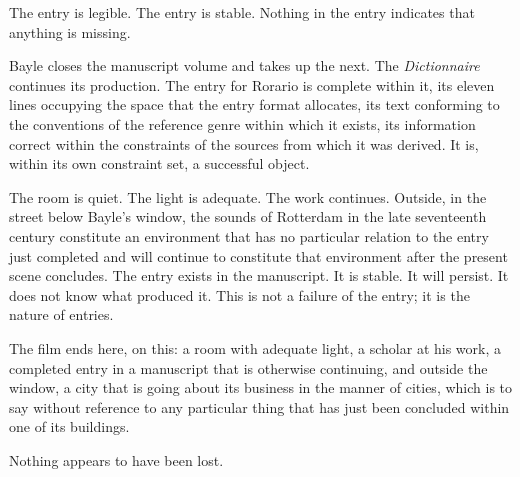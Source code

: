\documentclass[12pt, oneside]{article}
\newenvironment{action}{%
  \vspace{0.6em}%
  \noindent\ignorespaces%
}{%
  \par\vspace{0.6em}%
}
\begin{document}
\begin{action}
The entry is legible. The entry is stable. Nothing in the entry indicates that anything is missing.

Bayle closes the manuscript volume and takes up the next. The \textit{Dictionnaire} continues its production. The entry for Rorario is complete within it, its eleven lines occupying the space that the entry format allocates, its text conforming to the conventions of the reference genre within which it exists, its information correct within the constraints of the sources from which it was derived. It is, within its own constraint set, a successful object.

The room is quiet. The light is adequate. The work continues. Outside, in the street below Bayle's window, the sounds of Rotterdam in the late seventeenth century constitute an environment that has no particular relation to the entry just completed and will continue to constitute that environment after the present scene concludes. The entry exists in the manuscript. It is stable. It will persist. It does not know what produced it. This is not a failure of the entry; it is the nature of entries.

The film ends here, on this: a room with adequate light, a scholar at his work, a completed entry in a manuscript that is otherwise continuing, and outside the window, a city that is going about its business in the manner of cities, which is to say without reference to any particular thing that has just been concluded within one of its buildings.

Nothing appears to have been lost.
\end{action}

\end{document}
